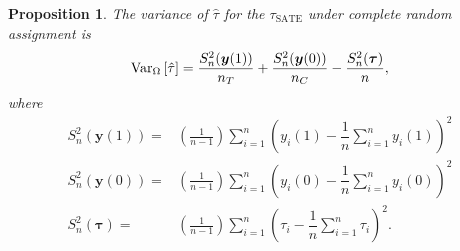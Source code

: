 \documentclass[12pt,leqno]{article}
\theoremstyle{newstyle}
\newtheorem{prop}[thm]{Proposition}
\newcommand{\bZ}{\bm{Z}}   \newcommand{\bz}{\bm{z}}   %
\newcommand{\po}[2]{y_{#1}(#2)}     %
\newcommand{\pov}[1]{\bm{y}(#1)}    %
\newcommand{\tauS}{\tau_{\text{SATE}}}
\newcommand{\tauhat}{\hat{\tau}}
\newcommand{\Ssq}[2][n]{S_{#1}^{2}(#2)}
\begin{document}
\begin{prop}
\label{prop: var est SATE}
The variance of $\tauhat$ for the $\tauS$ under complete random assignment is 
\small
\begin{equation}
\VarZ\left[\tauhat\right] = \dfrac{\Ssq{\pov{1}}}{n_T} + \dfrac{\Ssq{\pov{0}}}{n_C} - \dfrac{\Ssq{\bm{\tau}}}{n},
\end{equation}
\normalsize
where 
\small
\begin{align}
\Ssq{\pov{1}} = & \left(\frac{1}{n - 1}\right)\sum \limits_{i = 1}^n \left(\po{i}{1} - \dfrac{1}{n} \sum \limits_{i = 1}^n \po{i}{1}\right)^2 \label{eq: fin sample var treated} \\
\Ssq{\pov{0}} = & \left(\frac{1}{n - 1}\right)\sum \limits_{i = 1}^n \left(\po{i}{0} - \dfrac{1}{n} \sum \limits_{i = 1}^n \po{i}{0}\right)^2 \label{eq: fin sample var control} \\
\Ssq{\bm{\tau}} = & \left(\frac{1}{n - 1}\right)\sum \limits_{i = 1}^n \left(\tau_{i} - \dfrac{1}{n} \sum \limits_{i = 1}^n \tau_i\right)^2. \label{eq: fin sample cov}
\end{align}
\normalsize
\end{prop}
\end{document}
